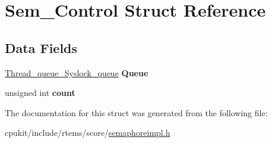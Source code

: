 \hypertarget{structSem__Control}{}\section{Sem\+\_\+\+Control Struct Reference}
\label{structSem__Control}
\subsection*{Data Fields}
\begin{DoxyCompactItemize}
\item 
\mbox{\label{structSem__Control_a376d7e08312f704aeb797529e727711b}} 
\mbox{\hyperlink{structThread__queue__Syslock__queue}{Thread\+\_\+queue\+\_\+\+Syslock\+\_\+queue}} {\bfseries Queue}
\item 
\mbox{\label{structSem__Control_aa732795e21a2ddf427b7aca0767f8b09}} 
unsigned int {\bfseries count}
\end{DoxyCompactItemize}


The documentation for this struct was generated from the following file\+:\begin{DoxyCompactItemize}
\item 
cpukit/include/rtems/score/\mbox{\hyperlink{score_2semaphoreimpl_8h}{semaphoreimpl.\+h}}\end{DoxyCompactItemize}
